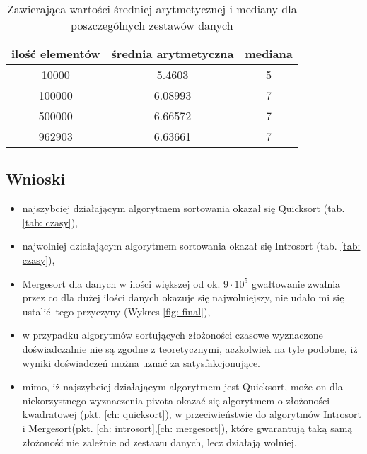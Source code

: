 \documentclass[12pt]{article}
\begin{document}
       \begin{table}[H]
              \centering
              \caption{Zawierająca wartości średniej arytmetycznej i mediany dla poszczególnych zestawów danych}

              \begin{tabular}{|c|c|c|}
              \hline
              ilość elementów & średnia arytmetyczna & mediana \\ \hline
              10000           & 5.4603                    & 5       \\ \hline
              100000          & 6.08993                    & 7       \\ \hline
              500000          & 6.66572                    & 7       \\ \hline
              962903          & 6.63661                    & 7       \\ \hline
              \end{tabular}
              \end{table}

       \subsection{Wnioski}
       \begin{itemize}
              \item najszybciej działającym algorytmem sortowania okazał się Quicksort (tab. \ref{tab: czasy}),
              \item najwolniej działającym algorytmem sortowania okazał się Introsort (tab. \ref{tab: czasy}),
              \item Mergesort dla danych w ilości większej od ok.  $9 \cdot 10^5$ gwałtowanie zwalnia przez co dla dużej ilości danych okazuje się najwolniejszy, nie udało mi się ustalić tego przyczyny (Wykres \ref{fig: final}),
              \item w przypadku algorytmów sortujących złożoności czasowe wyznaczone doświadczalnie nie są zgodne z teoretycznymi, aczkolwiek na tyle podobne,
              iż wyniki doświadczeń można uznać za satysfakcjonujące.
              \item mimo, iż najszybciej działającym algorytmem jest Quicksort, może on dla niekorzystnego wyznaczenia pivota
              okazać się algorytmem o złożoności kwadratowej (pkt. \ref{ch: quicksort}), w przeciwieństwie do algorytmów Introsort i Mergesort(pkt. \ref{ch: introsort},\ref{ch: mergesort}), które gwarantują taką 
              samą złożoność nie zależnie od zestawu danych, lecz działają wolniej.
       \end{itemize}


      
\end{document}
